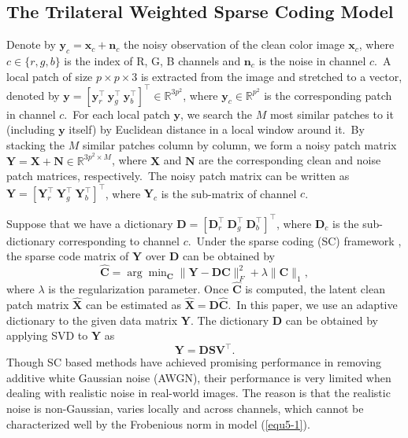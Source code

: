 \subsection{The Trilateral Weighted Sparse Coding Model}

Denote by $\bm{y}_{c}=\bm{x}_{c}+\bm{n}_{c}$ the noisy observation of the clean color image $\bm{x}_{c}$, where $c\in\{r, g, b\}$ is the index of R, G, B channels and $\bm{n}_{c}$ is the noise in channel $c$.\ A local patch of size $p\times p \times 3$ is extracted from the image and stretched to a vector, denoted by $\bm{y}=[\bm{y}_{r}^{\top}\ \bm{y}_{g}^{\top}\ \bm{y}_{b}^{\top}]^{\top}\in\mathbb{R}^{3p^{2}}$, where $\bm{y}_{c}\in\mathbb{R}^{p^{2}}$ is the corresponding patch in channel $c$.\ For each local patch $\bm{y}$, we search the $M$ most similar patches to it (including $\bm{y}$ itself) by Euclidean distance in a local window around it.\ By stacking the $M$ similar patches column by column, we form a noisy patch matrix $\bm{Y}=\bm{X}+\bm{N}\in\mathbb{R}^{3p^{2}\times M}$, where $\bm{X}$ and $\bm{N}$ are the corresponding clean and noise patch matrices, respectively.\ The noisy patch matrix can be written as $\bm{Y}=[\bm{Y}_{r}^{\top}\ \bm{Y}_{g}^{\top}\ \bm{Y}_{b}^{\top}]^{\top}$, where $\bm{Y}_{c}$ is the sub-matrix of channel $c$.\ 

Suppose that we have a dictionary $\bm{D}=[\bm{D}_{r}^{\top}\ \bm{D}_{g}^{\top}\ \bm{D}_{b}^{\top}]^{\top}$, where $\bm{D}_{c}$ is the sub-dictionary corresponding to channel $c$.\ Under the sparse coding (SC) framework \cite{lasso}, the sparse code matrix of $\bm{Y}$ over $\bm{D}$ can be obtained by
\begin{equation}
\label{equ5-1}
\hat{\bm{C}}
=
\arg\min\nolimits_{\bm{C}}
\|\bm{Y}-\bm{D}\bm{C}\|_{F}^{2}
+
\lambda\|\bm{C}\|_{1},
\end{equation}
where $\lambda$ is the regularization parameter. Once $\hat{\bm{C}}$ is computed,
the latent clean patch matrix $\hat{\bm{X}}$ can be estimated as $\hat{\bm{X}}=\bm{D}\hat{\bm{C}}$.\ In this paper, we use an adaptive dictionary to the given data matrix $\bm{Y}$. The dictionary $\bm{D}$ can be obtained by applying SVD to $\bm{Y}$ as 
\begin{equation}
\label{equ5-2}
\bm{Y} =\bm{D}\bm{S}\bm{V}^{\top}.
\end{equation}
Though SC based methods \cite{ksvd,lssc,ncsr} have achieved promising performance in removing additive white Gaussian noise (AWGN), their performance is very limited when dealing with realistic noise in real-world images. The reason is that the realistic noise is non-Gaussian, varies locally and across channels, which cannot be characterized well by the Frobenious norm in model (\ref{equ5-1}).  

